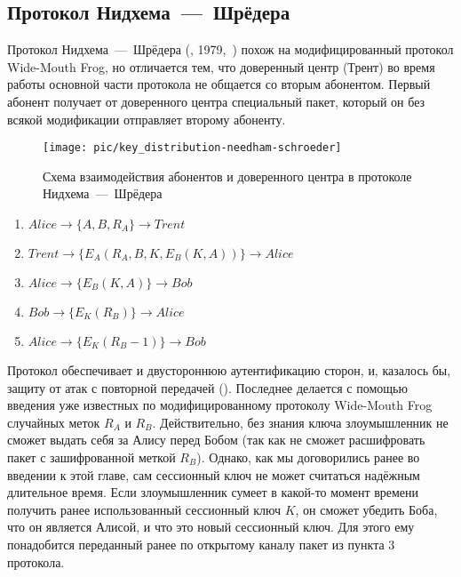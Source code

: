 \subsection{Протокол Нидхема~---~Шрёдера}

Протокол Нидхема~---~Шрёдера (, 1979,~\cite{Needham:Schroeder:1978}) похож на модифицированный протокол Wide-Mouth Frog, но отличается тем, что доверенный центр (Трент) во время работы основной части протокола не общается со вторым абонентом. Первый абонент получает от доверенного центра специальный пакет, который он без всякой модификации отправляет второму абоненту.

\begin{figure}[!htb]
    \centering
    \texttt{[image: pic/key\_distribution-needham-schroeder]}
    \caption{Схема взаимодействия абонентов и доверенного центра в протоколе Нидхема~---~Шрёдера\label{fig:key_distribution-needham-schroeder}}
\end{figure}

\begin{enumerate}
	\item $ Alice	\rightarrow \{ A, B, R_A \}						\rightarrow Trent $
	\item $ Trent	\rightarrow \{ E_A \left( R_A, B, K, E_B \left( K, A \right) \right) \}	\rightarrow Alice $
	\item $ Alice	\rightarrow \{ E_B \left( K, A \right) \}				\rightarrow Bob $
	\item $ Bob	\rightarrow \{ E_K \left( R_B \right) \}				\rightarrow Alice $
	\item $ Alice	\rightarrow \{ E_K \left( R_B - 1 \right) \}				\rightarrow Bob $
\end{enumerate}

Протокол обеспечивает и двустороннюю аутентификацию сторон, и, казалось бы, защиту от атак с повторной передачей (). Последнее делается с помощью введения уже известных по модифицированному протоколу Wide-Mouth Frog случайных меток $R_A$ и $R_B$. Действительно, без знания ключа злоумышленник не сможет выдать себя за Алису перед Бобом (так как не сможет расшифровать пакет с зашифрованной меткой $R_B$). Однако, как мы договорились ранее во введении к этой главе, сам сессионный ключ не может считаться надёжным длительное время. Если злоумышленник сумеет в какой-то момент времени получить ранее использованный сессионный ключ $K$, он сможет убедить Боба, что он является Алисой, и что это новый сессионный ключ. Для этого ему понадобится переданный ранее по открытому каналу пакет из пункта 3 протокола.

